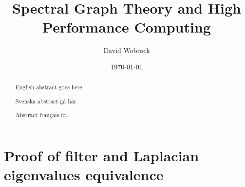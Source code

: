 \documentclass[]{kththesis}
\title{Spectral Graph Theory and High Performance Computing}
\author{David Wobrock}
\date{\today}
\begin{document}
\frontmatter %

\titlepage

\begin{abstract}
  English abstract goes here.
\end{abstract}

\begin{otherlanguage}{swedish}
  \begin{abstract}
   Svenska abstract gå här.
  \end{abstract}
\end{otherlanguage}

\begin{otherlanguage}{french}
  \begin{abstract}
   Abstract français ici.
  \end{abstract}
\end{otherlanguage}

\tableofcontents

\mainmatter %







\clearpage
\printbibliography

\appendix %

\chapter{Proof of filter and Laplacian eigenvalues equivalence}
\label{appendix:eigenvalue_proof}

\end{document}

